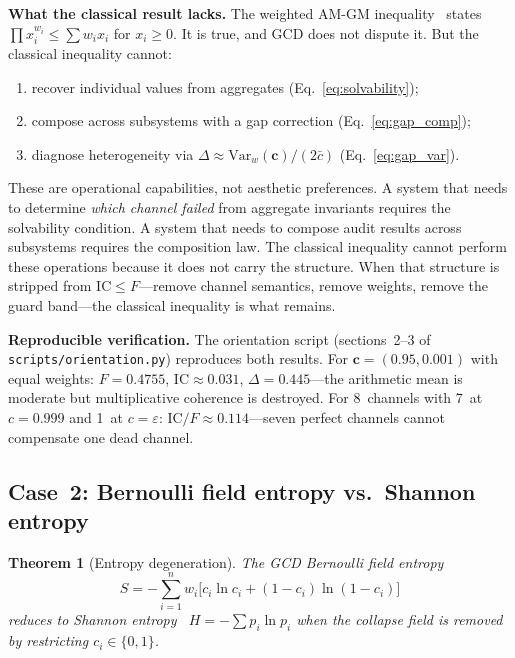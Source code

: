 \documentclass[
  aps,
  prd,
  twocolumn,
  superscriptaddress,
  nofootinbib,
  floatfix
]{revtex4-2}
\newtheorem{theorem}{Theorem}
\newcommand{\eps}{\varepsilon}
\newcommand{\beq}{\begin{equation}}
\newcommand{\eeq}{\end{equation}}
\newcommand{\tvec}{\mathbf{c}}
\newcommand{\IC}{\mathrm{IC}}
\begin{document}
\noindent\textbf{What the classical result lacks.}
The weighted AM-GM inequality~\cite{hardylittlewoodpolya1952}
states $\prod x_i^{w_i} \leq \sum w_i x_i$ for $x_i \geq 0$.
It is true, and GCD does not dispute it.  But the classical
inequality cannot:
\begin{enumerate}[leftmargin=*,label=(\alph*)]
\item recover individual values from aggregates
  (Eq.~\ref{eq:solvability});
\item compose across subsystems with a gap
  correction (Eq.~\ref{eq:gap_comp});
\item diagnose heterogeneity via $\Delta \approx
  \mathrm{Var}_w(\tvec)/(2\bar{c})$
  (Eq.~\ref{eq:gap_var}).
\end{enumerate}
These are operational capabilities, not aesthetic preferences.
A system that needs to determine \emph{which channel failed}
from aggregate invariants requires the solvability condition.
A system that needs to compose audit results across subsystems
requires the composition law.  The classical inequality cannot
perform these operations because it does not carry the structure.
When that structure is stripped from $\IC \leq F$---remove
channel semantics, remove weights, remove the guard band---the
classical inequality is what remains.

\noindent\textbf{Reproducible verification.}
The orientation script (sections~2--3 of
\texttt{scripts/orientation.py}) reproduces both results.
For $\tvec = (0.95, 0.001)$ with equal weights:
$F = 0.4755$, $\IC \approx 0.031$,
$\Delta = 0.445$---the arithmetic mean is moderate but
multiplicative coherence is destroyed.  For 8~channels with
7~at $c = 0.999$ and 1~at $c = \eps$:
$\IC/F \approx 0.114$---seven perfect channels cannot
compensate one dead channel.

\subsection{Case~2: Bernoulli field entropy vs.\ Shannon entropy}

\begin{theorem}[Entropy degeneration]
\label{thm:entropy}
The GCD Bernoulli field entropy
\beq
  S = -\!\sum_{i=1}^n w_i\bigl[
    c_i \ln c_i + (1{-}c_i)\ln(1{-}c_i)\bigr]
  \label{eq:bernoulli_S}
\eeq
reduces to Shannon entropy~\cite{shannon1948}
$H = -\sum p_i \ln p_i$ when the collapse field is removed by
restricting $c_i \in \{0, 1\}$.
\end{theorem}
\end{document}
